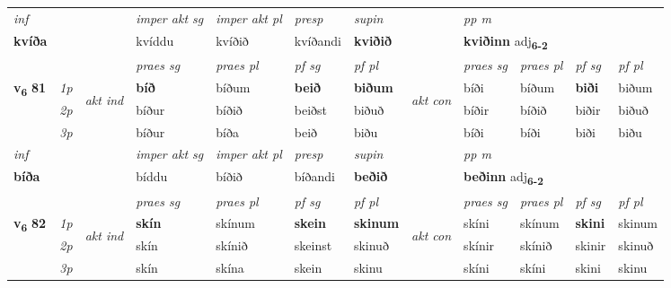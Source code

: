 \begin{longtable}[l]{X>{\footnotesize\itshape}llXXXXlXXXX}
   {\textit{inf}} & &  & \textit{imper akt sg} & \textit{imper akt pl}   & \textit{presp} & \textit{supin}  && \textit{pp m} \\*
  {\textbf{kvíða}} & && kvíddu  & kvíðið   & kvíðandi &  \textbf{kviðið}  && \multicolumn{2}{l}{\textbf{kviðinn} adj\textbf{\textsubscript{6-2}}} \\*

\midrule

 & &   & \textit{praes sg}  & \textit{praes pl}    & \textit{ pf sg} & \textit{pf pl} & & \textit{praes sg}  & \textit{praes pl}    & \textit{pf sg} & \textit{pf pl }  \\ \cmidrule{4-7} \cmidrule{9-12}
 \multirow{2}{*}{{{\textbf{v{\textsubscript{6}}} \Large{\textbf{81}}}}}  & 1p & \multirow{3}{*}{\begin{turn}{90}\textit{akt ind}\end{turn}} & \textbf{bíð} & bíðum & \textbf{beið} & \textbf{biðum} & \multirow{3}{*}{\begin{turn}{90}\textit{akt con}\end{turn}} &bíði & bíðum & \textbf{biði} & biðum\\*
 & 2p &  &  bíður  & bíðið & beiðst & biðuð & & bíðir & bíðið & biðir & biðuð \\*
 & 3p &  & bíður & bíða & beið & biðu & & bíði & bíði& biði & biðu \\*
\cmidrule{4-7} \cmidrule{9-12}

   {\textit{inf}} & &  & \textit{imper akt sg} & \textit{imper akt pl}   & \textit{presp} & \textit{supin}  && \textit{pp m} \\*
  {\textbf{bíða}} & && bíddu  & bíðið   & bíðandi &  \textbf{beðið}  && \multicolumn{2}{l}{\textbf{beðinn} adj\textbf{\textsubscript{6-2}}} \\*

\midrule

 & &   & \textit{praes sg}  & \textit{praes pl}    & \textit{ pf sg} & \textit{pf pl} & & \textit{praes sg}  & \textit{praes pl}    & \textit{pf sg} & \textit{pf pl }  \\ \cmidrule{4-7} \cmidrule{9-12}
 \multirow{2}{*}{{{\textbf{v{\textsubscript{6}}} \Large{\textbf{82}}}}}  & 1p & \multirow{3}{*}{\begin{turn}{90}\textit{akt ind}\end{turn}} & \textbf{skín} & skínum & \textbf{skein} & \textbf{skinum} & \multirow{3}{*}{\begin{turn}{90}\textit{akt con}\end{turn}} &skíni & skínum & \textbf{skini} & skinum\\*
 & 2p &  &  skín  & skínið & skeinst & skinuð & & skínir & skínið & skinir & skinuð \\*
 & 3p &  & skín & skína & skein & skinu & & skíni & skíni& skini & skinu \\*
\cmidrule{4-7} \cmidrule{9-12}


\end{longtable}
